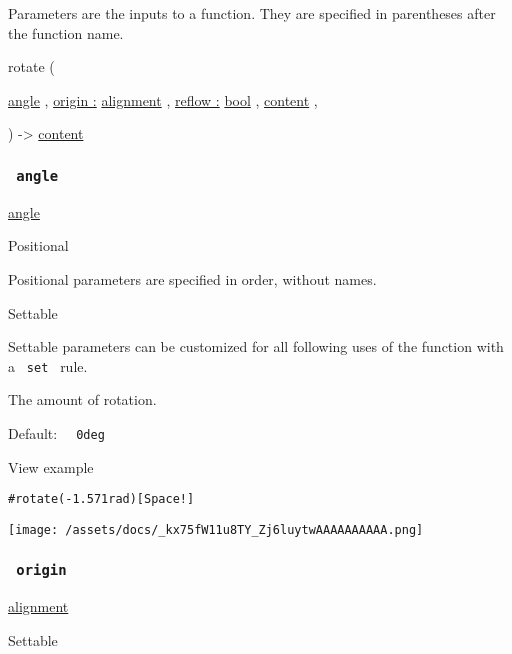 \label{parameters-tooltip}
Parameters are the inputs to a function. They are specified in
parentheses after the function name.

{ rotate } (

{ \hyperref[parameters-angle]{}
\href{/docs/reference/layout/angle/}{angle} , } {
\hyperref[parameters-origin]{origin :}
\href{/docs/reference/layout/alignment/}{alignment} , } {
\hyperref[parameters-reflow]{reflow :}
\href{/docs/reference/foundations/bool/}{bool} , } {
\href{/docs/reference/foundations/content/}{content} , }

) -\textgreater{} \href{/docs/reference/foundations/content/}{content}

\subsubsection{\texorpdfstring{\texttt{\ angle\ }}{ angle }}\label{parameters-angle}

\href{/docs/reference/layout/angle/}{angle}

{{ Positional }}

\label{parameters-angle-positional-tooltip}
Positional parameters are specified in order, without names.

{{ Settable }}

\label{parameters-angle-settable-tooltip}
Settable parameters can be customized for all following uses of the
function with a \texttt{\ set\ } rule.

The amount of rotation.

Default: \texttt{\ }{\texttt{\ 0deg\ }}\texttt{\ }


View example

\begin{verbatim}
#rotate(-1.571rad)[Space!]
\end{verbatim}

\texttt{[image: /assets/docs/\_kx75fW11u8TY\_Zj6luytwAAAAAAAAAA.png]}

\subsubsection{\texorpdfstring{\texttt{\ origin\ }}{ origin }}\label{parameters-origin}

\href{/docs/reference/layout/alignment/}{alignment}

{{ Settable }}

